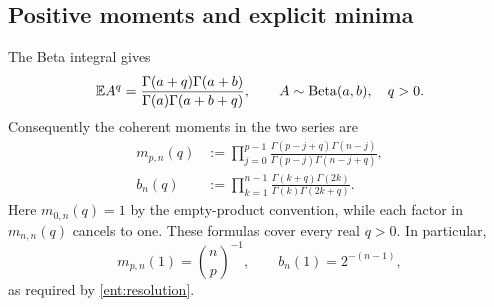 \subsection{Positive moments and explicit minima}

The Beta integral gives
\begin{equation}
 \mathbb E A^q=
 \frac{\Gamma(a+q)\Gamma(a+b)}
 {\Gamma(a)\Gamma(a+b+q)},
 \qquad A\sim\operatorname{Beta}(a,b),\quad q>0.
 \label{ent:beta-moment}
\end{equation}
Consequently the coherent moments in the two series are
\begin{align}
 m_{p,n}(q)
 &:=\prod_{j=0}^{p-1}
 \frac{\Gamma(p-j+q)\Gamma(n-j)}
 {\Gamma(p-j)\Gamma(n-j+q)},
 \label{ent:exterior-moments}\\
 b_n(q)
 &:=\prod_{k=1}^{n-1}
 \frac{\Gamma(k+q)\Gamma(2k)}
 {\Gamma(k)\Gamma(2k+q)}.
 \label{ent:spin-moments}
\end{align}
Here $m_{0,n}(q)=1$ by the empty-product convention, while each
factor in $m_{n,n}(q)$ cancels to one. These formulas cover every
real $q>0$. In particular,
\begin{equation}
 m_{p,n}(1)=\binom np^{-1},\qquad
 b_n(1)=2^{-(n-1)},
 \label{ent:first-moments}
\end{equation}
as required by \eqref{ent:resolution}.


